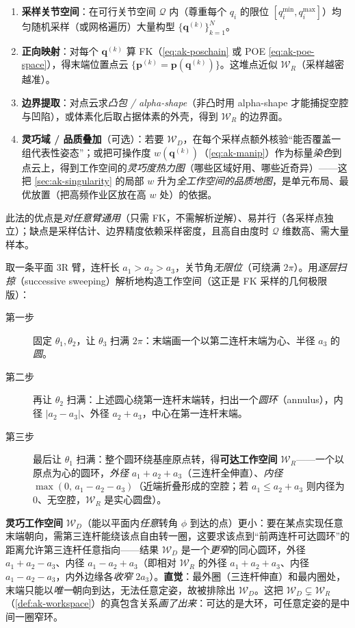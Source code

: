 \begin{enumerate}
  \item \textbf{采样关节空间}：在可行关节空间 $\mathcal{Q}$ 内（尊重每个 $q_i$ 的限位 $[q_i^{\min},q_i^{\max}]$）均匀随机采样（或网格遍历）大量构型 $\{\mathbf{q}^{(k)}\}_{k=1}^N$。
  \item \textbf{正向映射}：对每个 $\mathbf{q}^{(k)}$ 算 FK（\cref{eq:ak-poschain} 或 POE \cref{eq:ak-poe-space}），得末端位置点云 $\{\mathbf{p}^{(k)}=\mathbf{p}(\mathbf{q}^{(k)})\}$。这堆点近似 $\mathcal{W}_R$（采样越密越准）。
  \item \textbf{边界提取}：对点云求\emph{凸包 / alpha-shape}（非凸时用 alpha-shape 才能捕捉空腔与凹陷），或体素化后取占据体素的外壳，得到 $\mathcal{W}_R$ 的边界面。
  \item \textbf{灵巧域 / 品质叠加}（可选）：若要 $\mathcal{W}_D$，在每个采样点额外核验“能否覆盖一组代表性姿态”；或把可操作度 $w(\mathbf{q}^{(k)})$（\cref{eq:ak-manip}）作为标量\emph{染色}到点云上，得到工作空间的\emph{灵巧度热力图}（哪些区域好用、哪些近奇异）——这把 \cref{sec:ak-singularity} 的局部 $w$ 升为\emph{全工作空间的品质地图}，是单元布局、最优放置（把高频作业区放在高 $w$ 处）的依据。
\end{enumerate}
此法的优点是\emph{对任意臂通用}（只需 FK，不需解析逆解）、易并行（各采样点独立）；缺点是采样估计、边界精度依赖采样密度，且高自由度时 $\mathcal{Q}$ 维数高、需大量样本。

\begin{example}\label{exam:ak-ws-3r}
取一条平面 3R 臂，连杆长 $a_1>a_2>a_3$，关节角\emph{无限位}（可绕满 $2\pi$）。用\emph{逐层扫掠}（successive sweeping）解析地构造工作空间\cite{murray1994mathematical}（这正是 FK 采样的几何极限版）：
\begin{description}
  \item[第一步] 固定 $\theta_1,\theta_2$，让 $\theta_3$ 扫满 $2\pi$：末端画一个以第二连杆末端为心、半径 $a_3$ 的\emph{圆}。
  \item[第二步] 再让 $\theta_2$ 扫满：上述圆心绕第一连杆末端转，扫出一个\emph{圆环}（annulus），内径 $|a_2-a_3|$、外径 $a_2+a_3$，中心在第一连杆末端。
  \item[第三步] 最后让 $\theta_1$ 扫满：整个圆环绕基座原点转，得\textbf{可达工作空间} $\mathcal{W}_R$——一个以原点为心的圆环，\emph{外径} $a_1+a_2+a_3$（三连杆全伸直）、\emph{内径} $\max(0,\,a_1-a_2-a_3)$（近端折叠形成的空腔；若 $a_1\le a_2+a_3$ 则内径为 $0$、无空腔，$\mathcal{W}_R$ 是实心圆盘）。
\end{description}
\textbf{灵巧工作空间} $\mathcal{W}_D$（能以平面内\emph{任意}转角 $\phi$ 到达的点）更小：要在某点实现任意末端朝向，需第三连杆能绕该点自由转一圈，这要求该点到“前两连杆可达圆环”的距离允许第三连杆任意指向——结果 $\mathcal{W}_D$ 是一个\emph{更窄}的同心圆环，外径 $a_1+a_2-a_3$、内径 $a_1-a_2+a_3$（即相对 $\mathcal{W}_R$ 的外径 $a_1+a_2+a_3$、内径 $a_1-a_2-a_3$，内外边缘各\emph{收窄} $2a_3$）。\textbf{直觉}：最外圈（三连杆伸直）和最内圈处，末端只能以\emph{唯一}朝向到达，无法任意定姿，故被排除出 $\mathcal{W}_D$。这把 $\mathcal{W}_D\subsetneq\mathcal{W}_R$（\cref{def:ak-workspace}）的真包含关系\emph{画了出来}：可达的是大环，可任意定姿的是中间一圈窄环。
\end{example}


